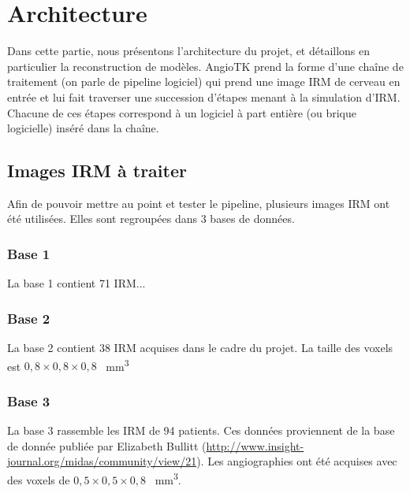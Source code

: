 \renewcommand{\chpath}{2-architecture/}
\renewcommand{\imgpath}{\chpath img/}
\renewcommand{\secpath}{\chpath}
\chapter{Architecture}
\label{chap:archi}

\newcommand{\imgW}{.8}

Dans cette partie, nous présentons l'architecture du projet, et détaillons en particulier la reconstruction de modèles. AngioTK prend la forme d'une chaîne de traitement (on parle de pipeline logiciel) qui prend une image IRM de cerveau en entrée et lui fait traverser une succession d'étapes menant à la simulation d'IRM. Chacune de ces étapes correspond à un logiciel à part entière (ou brique logicielle) inséré dans la chaîne.

\section{Images IRM à traiter}

Afin de pouvoir mettre au point et tester le pipeline, plusieurs images IRM ont été utilisées. Elles sont regroupées dans 3 bases de données.

\subsection{Base 1}

La base 1 contient 71 IRM...

\subsection{Base 2}

La base 2 contient 38 IRM acquises dans le cadre du projet. La taille des voxels est $0,8\times0,8\times0,8$ \SI{}{\milli\meter\cubed}

\subsection{Base 3}

La base 3 rassemble les IRM de 94 patients. Ces données proviennent de la base de donnée publiée par Elizabeth Bullitt (\href{http://www.insight-journal.org/midas/community/view/21}{http://www.insight-journal.org/midas/community/view/21}). Les angiographies ont été acquises avec des voxels de $0,5\times0,5\times0,8$ \SI{}{\milli\meter\cubed}.

